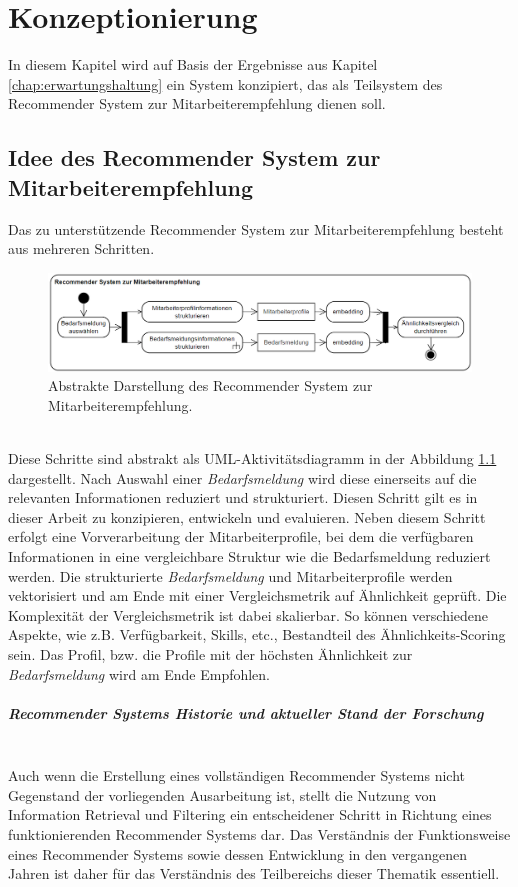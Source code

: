 \chapter{Konzeptionierung}
\label{chap:konzeption}
In diesem Kapitel wird auf Basis der Ergebnisse aus Kapitel \ref{chap:erwartungshaltung} ein System konzipiert, das als Teilsystem des Recommender System zur Mitarbeiterempfehlung dienen soll.
\section{Idee des Recommender System zur Mitarbeiterempfehlung}
Das zu unterstützende Recommender System zur Mitarbeiterempfehlung besteht aus mehreren Schritten.\\
\begin{figure}[H]
	\centering  
	\includegraphics[width=\linewidth]{Abbildungen/recommendersystem.png}
	\caption{Abstrakte Darstellung des Recommender System zur Mitarbeiterempfehlung.}
	\label{fig:recommendersystem}
\end{figure}\mbox{} \\
Diese Schritte sind abstrakt als UML-Aktivitätsdiagramm in der Abbildung \ref{fig:recommendersystem} dargestellt. Nach Auswahl einer \emph{Bedarfsmeldung} wird diese einerseits auf die relevanten Informationen reduziert und strukturiert. Diesen Schritt gilt es in dieser Arbeit zu konzipieren, entwickeln und evaluieren. Neben diesem Schritt erfolgt eine Vorverarbeitung der Mitarbeiterprofile, bei dem die verfügbaren Informationen in eine vergleichbare Struktur wie die Bedarfsmeldung reduziert werden. Die strukturierte \emph{Bedarfsmeldung} und Mitarbeiterprofile werden vektorisiert und am Ende mit einer Vergleichsmetrik auf Ähnlichkeit geprüft. Die Komplexität der Vergleichsmetrik ist dabei skalierbar. So können verschiedene Aspekte, wie z.B. Verfügbarkeit, Skills, etc., Bestandteil des Ähnlichkeits-Scoring sein. Das Profil, bzw. die Profile mit der höchsten Ähnlichkeit zur \emph{Bedarfsmeldung} wird am Ende Empfohlen.
\paragraph{Recommender Systems Historie und aktueller Stand der Forschung}\label{sec:rechistory}\mbox{} \\
Auch wenn die Erstellung eines vollständigen Recommender Systems nicht Gegenstand der vorliegenden Ausarbeitung ist, stellt die Nutzung von Information Retrieval und Filtering ein entscheidener Schritt in Richtung eines funktionierenden Recommender Systems dar. Das Verständnis der Funktionsweise eines Recommender Systems sowie dessen Entwicklung in den vergangenen Jahren ist daher für das Verständnis des Teilbereichs dieser Thematik essentiell.\\

